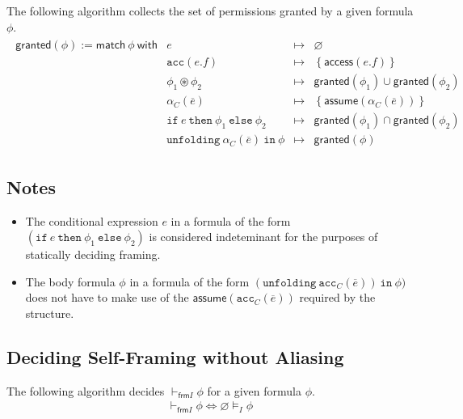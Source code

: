\documentclass{article}
\newcommand{\tsf}{\textsf}
\newcommand{\ttt}{\texttt}
\newcommand{\access}{\tsf{access}}
\newcommand{\assume}{\tsf{assume}}
\newcommand{\frames}{\vDash_I}
\newcommand{\selfframes}{\vdash_{\tsf{frm}I}}
\newcommand{\mt}{\mapsto}
\newcommand{\set}[1]{\left\{ #1 \right\}}
\newcommand{\cast}{\circledast}
\renewcommand{\vec}{\overline}
\renewcommand{\empty}{\varnothing}
\newcommand{\cif}{\ttt{if}}
\newcommand{\cthen}{\ttt{then}}
\newcommand{\celse}{\ttt{else}}
\newcommand{\cacc}{\ttt{acc}}
\newcommand{\cunfolding}{\ttt{unfolding}}
\newcommand{\cin}{\ttt{in}}
\newcommand{\granted}{\tsf{granted}}
\begin{document}
\noindent
The following algorithm collects the set of permissions granted by a given formula $\phi$.
\begin{align*}
\begin{array}{r|lrl}
\granted(\phi)
:= \tsf{match} \ \phi \ \tsf{with}
%
%
& e                   &\mt& \empty \\
%
%
& \cacc(e.f)          &\mt& \set{ \access(e.f) }
\\
& \phi_1 \cast \phi_2 &\mt& \granted(\phi_1)
                      \cup  \granted(\phi_2)
\\
& \alpha_C(\vec{e})   &\mt& \set{ \assume(\alpha_C(\vec{e})) }
\\
& \cif \ e \ \cthen \ \phi_1 \ \celse \ \phi_2
                      &\mt& \granted(\phi_1) \cap \granted(\phi_2)
\\
& \cunfolding \ \alpha_C(\vec{e}) \ \cin \ \phi
                      &\mt& \granted(\phi)
\end{array}
\end{align*}

\subsection{Notes}

\begin{itemize}
\item The conditional expression $e$ in a formula of the form $(\cif \ e \ \cthen \ \phi_1 \ \celse \ \phi_2)$ is considered indeteminant for the purposes of statically deciding framing.

\item The body formula $\phi$ in a formula of the form $(\cunfolding \ \cacc_C(\vec{e})) \ \cin \ \phi)$ does not have to make use of the $\assume(\cacc_C(\vec{e}))$ required by the structure.
\end{itemize}

\subsection{Deciding Self-Framing without Aliasing}

\noindent
The following algorithm decides $\selfframes \phi$ for a given formula $\phi$.
\begin{align*}
\selfframes \phi \iff \empty \frames \phi
\end{align*}
\end{document}
